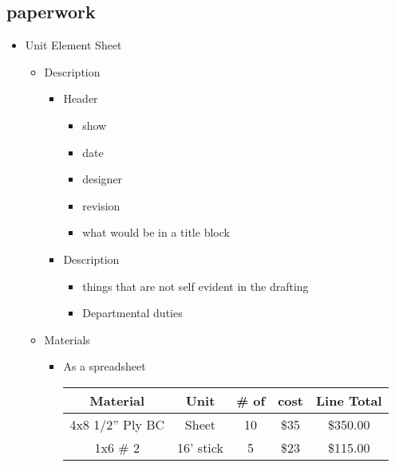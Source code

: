 \documentclass[12pt]{article}
\begin{document}
        \subsection{paperwork}
            \begin{itemize}
                \item Unit Element Sheet
                \begin{itemize}
                    \item Description
                    \begin{itemize}
                        \item Header
                        \begin{itemize}
                            \item show
                            \item date
                            \item designer
                            \item revision
                            \item what would be in a title block
                        \end{itemize}
                        \item Description
                        \begin{itemize}
                            \item things that are not self evident in the drafting
                            \item Departmental duties
                        \end{itemize}
                    \end{itemize}
                    \item Materials
                    \begin{itemize}
                        \item As a spreadsheet
                        \begin{center}
                            \begin{tabular}{ c|c|c|c|c }
                                Material & Unit & \# of & cost & Line Total\\
                                \hline
                                \hline
                                4x8 1/2'' Ply BC & Sheet & 10 & \$35 & \$350.00\\
                                \hline
                                1x6 \# 2 & 16' stick & 5 & \$23 & \$115.00\\

\end{tabular}
\end{center}
\end{itemize}
\end{itemize}
\end{itemize}
\end{document}
